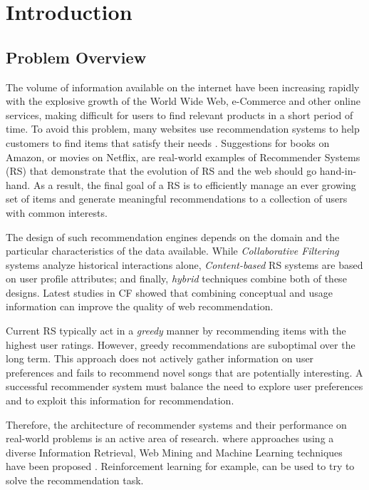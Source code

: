 \chapter{Introduction}
\label{chapterlabel1}

\section{Problem Overview}

The volume of information available on the internet have been increasing rapidly with the explosive growth of the World Wide Web, e-Commerce and other online services, making difficult for users to find relevant products in a short period of time. To avoid this problem, many websites use recommendation systems to help customers to find items that satisfy their needs \cite{resnick1997recommender}. Suggestions for books on Amazon, or movies on Netflix, are real-world examples of Recommender Systems (RS) that demonstrate that the evolution of RS and the web should go hand-in-hand. As a result, the final goal of a RS is to efficiently manage an ever growing set of items and generate meaningful recommendations to a collection of users with common interests.

The design of such recommendation engines depends on the domain and the particular characteristics of the data available. While \textit{Collaborative Filtering} systems analyze historical interactions alone, \textit{Content-based} RS systems are based on user profile attributes; and finally, \textit{hybrid} techniques combine both of these designs. Latest studies in CF \cite{bobadilla2013recommender} showed that combining conceptual and usage information can improve the quality of web recommendation.

Current RS typically act in a \textit{greedy} manner by recommending items with the highest user ratings. However, greedy recommendations are suboptimal over the long term. This approach does not actively gather information on user preferences and fails to recommend novel songs that are potentially interesting. A successful recommender system must balance the need to explore user preferences and to exploit this information for recommendation.

Therefore, the architecture of recommender systems and their performance on real-world problems is an active area of research. where approaches using a diverse Information Retrieval, Web Mining and Machine Learning techniques have been proposed \cite{bobadilla2013recommender}. Reinforcement learning\cite{sutton1998reinforcement} for example, can be used to try to solve the recommendation task. 

